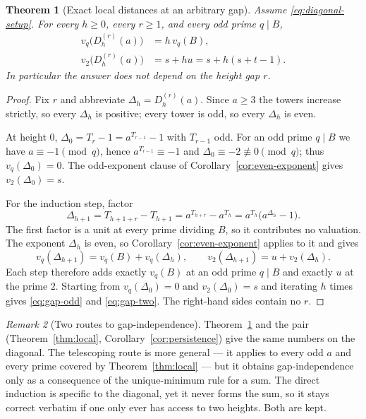 \documentclass[11pt,letterpaper]{article}
\numberwithin{equation}{section}
\newtheorem{theorem}{Theorem}[section]
\theoremstyle{definition}
\theoremstyle{remark}
\newtheorem{remark}[theorem]{Remark}
\begin{document}
\begin{theorem}[Exact local distances at an arbitrary gap]\label{thm:gap-local}
Assume \eqref{eq:diagonal-setup}. For every $h\ge0$, every $r\ge1$, and every odd prime $q\mid B$,
\begin{align}
 v_q\bigl(D_h^{(r)}(a)\bigr)&=h\,v_q(B),\label{eq:gap-odd}\\
 v_2\bigl(D_h^{(r)}(a)\bigr)&=s+hu=s+h(s+t-1).\label{eq:gap-two}
\end{align}
In particular the answer does not depend on the height gap $r$.
\end{theorem}
\begin{proof}
Fix $r$ and abbreviate $\Delta_h=D_h^{(r)}(a)$. Since $a\ge3$ the towers increase strictly, so every $\Delta_h$ is positive; every tower is odd, so every $\Delta_h$ is even.

At height $0$, $\Delta_0=T_r-1=a^{T_{r-1}}-1$ with $T_{r-1}$ odd. For an odd prime $q\mid B$ we have $a\equiv-1\pmod q$, hence $a^{T_{r-1}}\equiv-1$ and $\Delta_0\equiv-2\not\equiv0\pmod q$; thus $v_q(\Delta_0)=0$. The odd-exponent clause of Corollary~\ref{cor:even-exponent} gives $v_2(\Delta_0)=s$.

For the induction step, factor
\begin{equation}\label{eq:gap-Drec}
 \Delta_{h+1}=T_{h+1+r}-T_{h+1}=a^{T_{h+r}}-a^{T_h}=a^{T_h}\bigl(a^{\Delta_h}-1\bigr).
\end{equation}
The first factor is a unit at every prime dividing $B$, so it contributes no valuation. The exponent $\Delta_h$ is even, so Corollary~\ref{cor:even-exponent} applies to it and gives
\[
 v_q(\Delta_{h+1})=v_q(B)+v_q(\Delta_h),
 \qquad
 v_2(\Delta_{h+1})=u+v_2(\Delta_h).
\]
Each step therefore adds exactly $v_q(B)$ at an odd prime $q\mid B$ and exactly $u$ at the prime $2$. Starting from $v_q(\Delta_0)=0$ and $v_2(\Delta_0)=s$ and iterating $h$ times gives \eqref{eq:gap-odd} and \eqref{eq:gap-two}. The right-hand sides contain no $r$.
\end{proof}

\begin{remark}[Two routes to gap-independence]\label{rem:two-routes}
Theorem~\ref{thm:gap-local} and the pair (Theorem~\ref{thm:local}, Corollary~\ref{cor:persistence}) give the same numbers on the diagonal. The telescoping route is more general --- it applies to every odd $a$ and every prime covered by Theorem~\ref{thm:local} --- but it obtains gap-independence only as a consequence of the unique-minimum rule for a sum. The direct induction is specific to the diagonal, yet it never forms the sum, so it stays correct verbatim if one only ever has access to two heights. Both are kept.
\end{remark}
\end{document}
